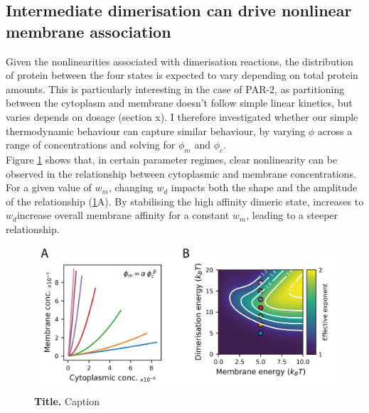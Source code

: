 \documentclass[12pt]{"article"}
\newcommand{\mycaption}[2]{\caption[#1]{\textbf{#1.} #2}}
\begin{document}
\subsection{Intermediate dimerisation can drive nonlinear membrane association}

Given the nonlinearities associated with dimerisation reactions, the distribution of protein between the four states is expected to vary depending on total protein amounts. This is particularly interesting in the case of PAR-2, as partitioning between the cytoplasm and membrane doesn’t follow simple linear kinetics, but varies depends on dosage (section x). I therefore investigated whether our simple thermodynamic behaviour can capture similar behaviour, by varying $\phi$ across a range of concentrations and solving for $\phi_m$ and $\phi_c$. \\

Figure \ref{fig:thermodynamic_model_feedback} shows that, in certain parameter regimes, clear nonlinearity can be observed in the relationship between cytoplasmic and membrane concentrations. For a given value of $w_m$, changing $w_d$ impacts both the shape and the amplitude of the relationship (\cref{fig:thermodynamic_model_feedback}A). By stabilising the high affinity dimeric state, increases to $w_d $increase overall membrane affinity for a constant $w_m$, leading to a steeper relationship. \\

\begin{figure}[!h]
\includegraphics[scale=1]{thermodynamic_model_feedback}
\setlength{\abovecaptionskip}{20pt}
\centering
\mycaption{Title}{Caption}
\label{fig:thermodynamic_model_feedback}
\end{figure}
\end{document}
